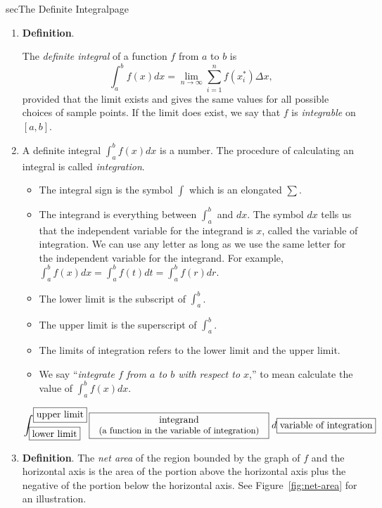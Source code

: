 \documentclass[../main]{subfiles}
\begin{document}
\begin{outline}{sec}{The Definite Integral}{page} \label{outline:definite-integral}
  \begin{enumerate}
    \item \textbf{Definition}. 
      \begin{mdframed}[style=simple]
        The \emph{definite integral} of a function \(f\) from \(a\) to \(b\) is
        \[
          \int_{a}^{b} f(x) dx = \lim_{n \to \infty} \sum_{i=1}^{n} f(x_{i}^{*}) \Delta x,
        \]
        provided that the limit exists and gives the same values for all possible choices of sample points. If the limit does exist, we say that \(f\) is \emph{integrable} on \([a,b]\). 
      \end{mdframed}
    \item A definite integral \(\int_{a}^{b} f(x) dx\) is a number. The procedure of calculating an integral is called \emph{integration}. 
      \begin{itemize}
        \item The integral sign is the symbol \(\int\) which is an elongated \(\sum\).
        \item The integrand is everything between \(\int_{a}^{b}\) and \(dx\). The symbol \(dx\) tells us that the independent variable for the integrand is \(x\), called the variable of integration. We can use any letter as long as we use the same letter for the independent variable for the integrand. For example, \(\int_{a}^{b} f(x) dx = \int_{a}^{b} f(t) dt = \int_{a}^{b} f(r) dr\).
        \item The lower limit is the subscript of \(\int_{a}^{b}\).
        \item The upper limit is the superscript of \(\int_{a}^{b}\).
        \item The limits of integration refers to the lower limit and the upper limit.
        \item We say ``\textit{integrate \(f\) from \(a\) to \(b\) with respect to \(x\)},'' to mean calculate the value of \(\int_{a}^{b} f(x) dx\).
      \end{itemize}

      \begin{mdframed}[style=simple]
        \huge
        \[
          \normalsize
          \int^{\fbox{upper limit}}_{\fbox{lower limit}} \fbox{\parbox{2.5in}{\centering integrand\\\small (a function in the variable of integration)}} \; d \fbox{variable of integration}
        \]
      \end{mdframed}
    \item \textbf{Definition}. The \emph{net area} of the region bounded by the graph of \(f\) and the horizontal axis is the area of the portion above the horizontal axis plus the negative of the portion below the horizontal axis. See Figure~\ref{fig:net-area} for an illustration.


\end{enumerate}
\end{outline}
\end{document}
